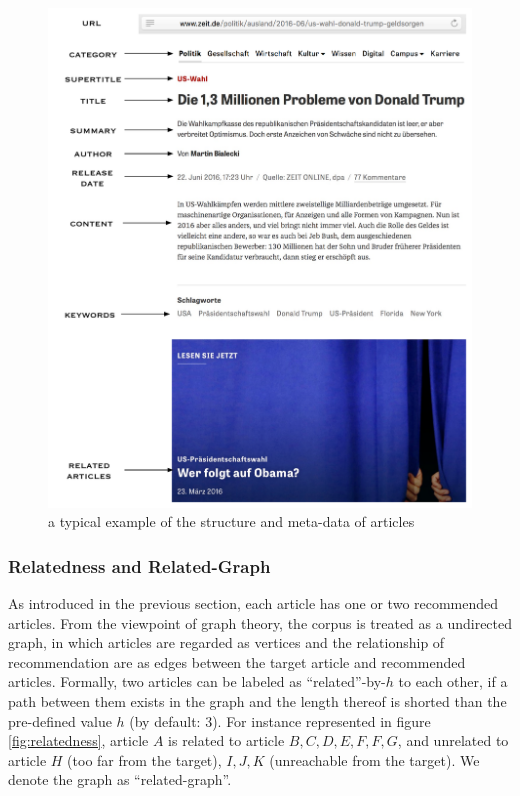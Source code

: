     \begin{figure}[!htb]
    \centering
    \includegraphics[width=1\textwidth]{fig/article.pdf}
    \caption{a typical example of the structure and meta-data of articles}
    \label{fig:article_structure}
    \end{figure}

\subsubsection{Relatedness and Related-Graph}

As introduced in the previous section, each article has one or two recommended articles. From the viewpoint of graph theory, the corpus is treated as a undirected graph, in which articles are regarded as vertices and the relationship of recommendation are as edges between the target article and recommended articles. Formally, two articles can be labeled as ``related''-by-$h$ to each other, if a path between them exists in the graph and the length thereof is shorted than the pre-defined value $h$ (by default: $3$). For instance represented in figure \ref{fig:relatedness}, article $A$ is related to article $B, C, D, E, F, F, G$, and unrelated to  article $H$ (too far from the target), $I, J, K$ (unreachable from the target). We denote the graph as ``related-graph''.
 
